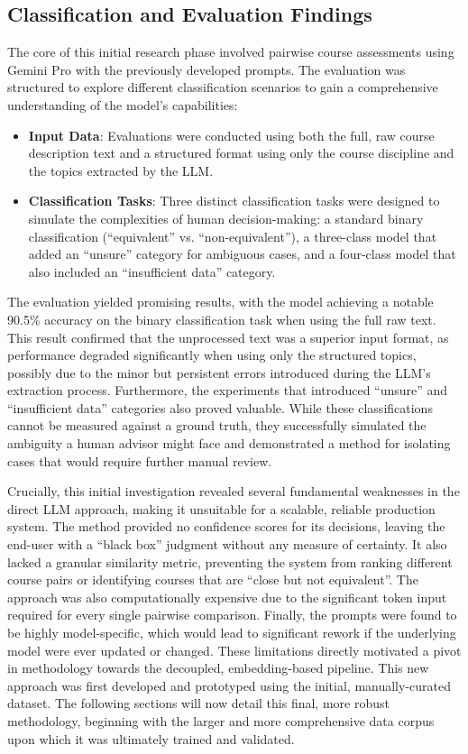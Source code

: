 \subsection{Classification and Evaluation Findings}
The core of this initial research phase involved pairwise course assessments using Gemini Pro with the previously developed prompts. The evaluation was structured to explore different classification scenarios to gain a comprehensive understanding of the model's capabilities:
\begin{itemize}
    \item \textbf{Input Data}: Evaluations were conducted using both the full, raw course description text and a structured format using only the course discipline and the topics extracted by the LLM.\@
    \item \textbf{Classification Tasks}: Three distinct classification tasks were designed to simulate the complexities of human decision-making: a standard binary classification (``equivalent'' vs. ``non-equivalent''), a three-class model that added an ``unsure'' category for ambiguous cases, and a four-class model that also included an ``insufficient data'' category.
\end{itemize}
The evaluation yielded promising results, with the model achieving a notable 90.5\% accuracy on the binary classification task when using the full raw text. This result confirmed that the unprocessed text was a superior input format, as performance degraded significantly when using only the structured topics, possibly due to the minor but persistent errors introduced during the LLM's extraction process. Furthermore, the experiments that introduced ``unsure'' and ``insufficient data'' categories also proved valuable. While these classifications cannot be measured against a ground truth, they successfully simulated the ambiguity a human advisor might face and demonstrated a method for isolating cases that would require further manual review.

Crucially, this initial investigation revealed several fundamental weaknesses in the direct LLM approach, making it unsuitable for a scalable, reliable production system. The method provided no confidence scores for its decisions, leaving the end-user with a ``black box'' judgment without any measure of certainty. It also lacked a granular similarity metric, preventing the system from ranking different course pairs or identifying courses that are ``close but not equivalent''. The approach was also computationally expensive due to the significant token input required for every single pairwise comparison. Finally, the prompts were found to be highly model-specific, which would lead to significant rework if the underlying model were ever updated or changed. These limitations directly motivated a pivot in methodology towards the decoupled, embedding-based pipeline. This new approach was first developed and prototyped using the initial, manually-curated dataset. The following sections will now detail this final, more robust methodology, beginning with the larger and more comprehensive data corpus upon which it was ultimately trained and validated.

